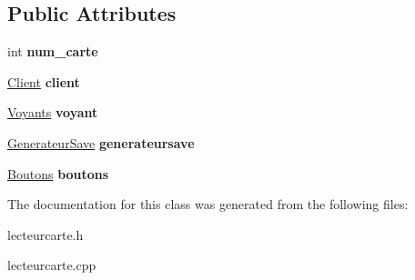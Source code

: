\subsection*{Public Attributes}
\begin{DoxyCompactItemize}
\item 
\mbox{\label{classLecteurCarte_a503cf240c6207763bde7e3363e01a24e}} 
int {\bfseries num\+\_\+carte}
\item 
\mbox{\label{classLecteurCarte_a94b3dd277eca1d1e1d2d4ab6e676c2ad}} 
\hyperlink{classClient}{Client} {\bfseries client}
\item 
\mbox{\label{classLecteurCarte_aa14219cc5dcb3093286e630a21922a01}} 
\hyperlink{classVoyants}{Voyants} {\bfseries voyant}
\item 
\mbox{\label{classLecteurCarte_af9574437ae12548412f7c6d63712f834}} 
\hyperlink{classGenerateurSave}{Generateur\+Save} {\bfseries generateursave}
\item 
\mbox{\label{classLecteurCarte_a84163cfaf41523f0b20252aba70536ef}} 
\hyperlink{classBoutons}{Boutons} {\bfseries boutons}
\end{DoxyCompactItemize}


The documentation for this class was generated from the following files\+:\begin{DoxyCompactItemize}
\item 
lecteurcarte.\+h\item 
lecteurcarte.\+cpp\end{DoxyCompactItemize}
